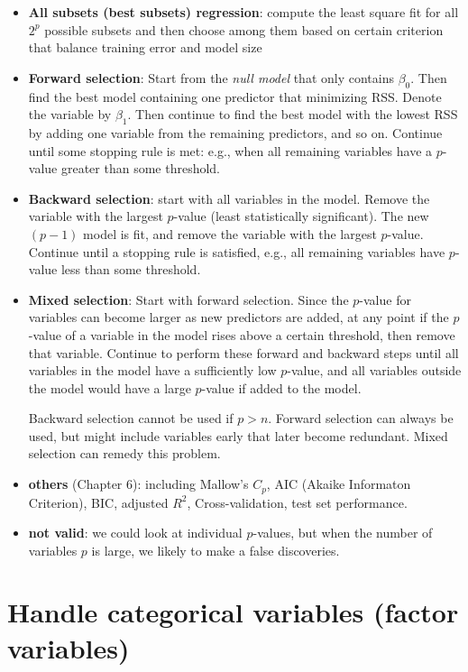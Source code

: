 \documentclass[
  letterpaper,
  DIV=11,
  numbers=noendperiod]{scrreprt}
\begin{document}
\begin{itemize}
\item
  \textbf{All subsets (best subsets) regression}: compute the least
  square fit for all \(2^p\) possible subsets and then choose among them
  based on certain criterion that balance training error and model size
\item
  \textbf{Forward selection}: Start from the \emph{null model} that only
  contains \(\beta_0\). Then find the best model containing one
  predictor that minimizing RSS. Denote the variable by \(\beta_1\).
  Then continue to find the best model with the lowest RSS by adding one
  variable from the remaining predictors, and so on. Continue until some
  stopping rule is met: e.g., when all remaining variables have a
  \(p\)-value greater than some threshold.
\item
  \textbf{Backward selection}: start with all variables in the model.
  Remove the variable with the largest \(p\)-value (least statistically
  significant). The new \((p-1)\) model is fit, and remove the variable
  with the largest \(p\)-value. Continue until a stopping rule is
  satisfied, e.g., all remaining variables have \(p\)-value less than
  some threshold.
\item
  \textbf{Mixed selection}: Start with forward selection. Since the
  \(p\)-value for variables can become larger as new predictors are
  added, at any point if the \(p\)-value of a variable in the model
  rises above a certain threshold, then remove that variable. Continue
  to perform these forward and backward steps until all variables in the
  model have a sufficiently low \(p\)-value, and all variables outside
  the model would have a large \(p\)-value if added to the model.

  Backward selection cannot be used if \(p>n\). Forward selection can
  always be used, but might include variables early that later become
  redundant. Mixed selection can remedy this problem.
\item
  \textbf{others} (Chapter 6): including Mallow's \(C_p\), AIC (Akaike
  Informaton Criterion), BIC, adjusted \(R^2\), Cross-validation, test
  set performance.
\item
  \textbf{not valid}: we could look at individual \(p\)-values, but when
  the number of variables \(p\) is large, we likely to make a false
  discoveries.
\end{itemize}

\section{Handle categorical variables (factor
variables)}\label{handle-categorical-variables-factor-variables}
\end{document}
